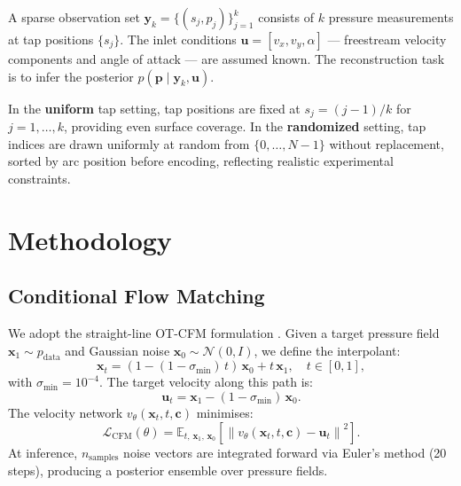 \documentclass[12pt]{article}
\begin{document}
A sparse observation set $\mathbf{y}_k = \{(s_j, p_j)\}_{j=1}^k$ consists of
$k$ pressure measurements at tap positions $\{s_j\}$. The inlet conditions
$\mathbf{u} = [v_x, v_y, \alpha]$ — freestream velocity components and angle of
attack — are assumed known. The reconstruction task is to infer the posterior
$p(\mathbf{p} \mid \mathbf{y}_k, \mathbf{u})$.

In the \textbf{uniform} tap setting, tap positions are fixed at
$s_j = (j-1)/k$ for $j = 1, \ldots, k$, providing even surface coverage.
In the \textbf{randomized} setting, tap indices are drawn uniformly at random
from $\{0, \ldots, N-1\}$ without replacement, sorted by arc position before
encoding, reflecting realistic experimental constraints.

\section{Methodology}
\label{sec:method}

\subsection{Conditional Flow Matching}

We adopt the straight-line OT-CFM formulation \citep{lipman2022flow}. Given a
target pressure field $\mathbf{x}_1 \sim p_{\text{data}}$ and Gaussian noise
$\mathbf{x}_0 \sim \mathcal{N}(0, I)$, we define the interpolant:
\begin{equation}
    \mathbf{x}_t = (1 - (1 - \sigma_\mathrm{min})\,t)\,\mathbf{x}_0 + t\,\mathbf{x}_1,
    \quad t \in [0, 1],
    \label{eq:interpolant}
\end{equation}
with $\sigma_\mathrm{min} = 10^{-4}$. The target velocity along this path is:
\begin{equation}
    \mathbf{u}_t = \mathbf{x}_1 - (1 - \sigma_\mathrm{min})\,\mathbf{x}_0.
\end{equation}
The velocity network $v_\theta(\mathbf{x}_t, t, \mathbf{c})$ minimises:
\begin{equation}
    \mathcal{L}_{\mathrm{CFM}}(\theta) =
    \mathbb{E}_{t,\, \mathbf{x}_1,\, \mathbf{x}_0}
    \left[\left\| v_\theta(\mathbf{x}_t, t, \mathbf{c}) - \mathbf{u}_t \right\|^2\right].
    \label{eq:cfm_loss}
\end{equation}
At inference, $n_\mathrm{samples}$ noise vectors are integrated forward via
Euler's method (20 steps), producing a posterior ensemble over pressure fields.
\end{document}

